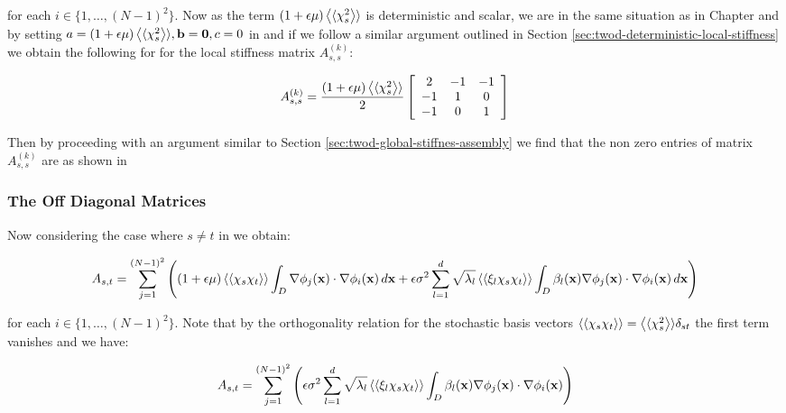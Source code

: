 for each $i \in \{1,\ldots,(N-1)^2\}$. Now as the term $(1 +
\epsilon\mu)\left\langle\langle\chi_s^2\right\rangle\rangle$ is deterministic and scalar, we are in the same
situation as in Chapter  and by setting
$a = (1 + \epsilon\mu)\left\langle\langle\chi_s^2\right\rangle\rangle, \mathbf{b} = \mathbf{0}, c = 0$ in
 and if we follow a similar argument
outlined in Section \ref{sec:twod-deterministic-local-stiffness} we obtain the
following for for the local stiffness matrix $A^{(k)}_{s,s}$:

\begin{equation}
    A^{(k)}_{s,s} = \frac{(1 + \epsilon\mu)\left\langle\langle\chi_s^2\right\rangle\rangle}{2}
    \left[\begin{array}{c c c}
        2  & -1 & -1 \\
        -1 & 1  & 0 \\
        -1 & 0  & 1
    \end{array}\right]
\end{equation}

Then by proceeding with an argument similar to Section
\ref{sec:twod-global-stiffnes-assembly} we find that the non zero entries of
matrix $A^{(k)}_{s,s}$ are as shown in 

\subsubsection{The Off Diagonal Matrices}

Now considering the case where $s \neq t$ in 
we obtain:

\begin{equation}
    A_{s,t} = \sum_{j=1}^{(N-1)^2}\left(
(1 + \epsilon\mu)\left\langle\langle\chi_s\chi_t\right\rangle\rangle
      \int_D\nabla\phi_j(\mathbf{x})\cdot\nabla\phi_i(\mathbf{x})\, d\mathbf{x} +
      \epsilon\sigma^2\sum_{l=1}^d\sqrt{\lambda_l}\left\langle\langle\xi_l\chi_s\chi_t\right\rangle\rangle
      \int_D\beta_l(\mathbf{x})\nabla\phi_j(\mathbf{x})\cdot\nabla\phi_i(\mathbf{x})\, d\mathbf{x}
      \right)
\end{equation}

for each $i \in \{1,\ldots,(N-1)^2\}$. Note that by the orthogonality
relation for the stochastic basis vectors $\left\langle\langle\chi_s\chi_t\right\rangle\rangle =
\left\langle\langle\chi_s^2\right\rangle\rangle\delta_{st}$ the first term vanishes and we have:

\begin{equation}
    A_{s,t} = \sum_{j=1}^{(N-1)^2}\left(\epsilon\sigma^2
    \sum_{l=1}^d\sqrt{\lambda_l}\left\langle\langle\xi_l\chi_s\chi_t\right\rangle\rangle
    \int_D\beta_l(\mathbf{x})\nabla\phi_j(\mathbf{x})\cdot\nabla\phi_i(\mathbf{x})\right)
\end{equation}


